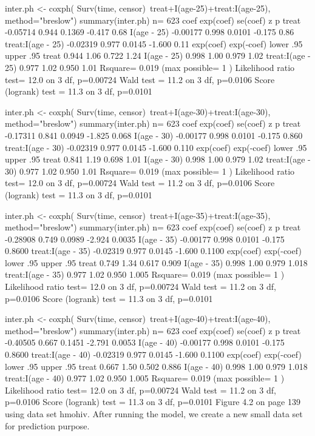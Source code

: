 inter.ph <- coxph( Surv(time, censor)~treat+I(age-25)+treat:I(age-25), method="breslow")
summary(inter.ph)
  n= 623 
                      coef exp(coef) se(coef)      z    p
treat             -0.05714     0.944   0.1369 -0.417 0.68
I(age - 25)       -0.00177     0.998   0.0101 -0.175 0.86
treat:I(age - 25) -0.02319     0.977   0.0145 -1.600 0.11
                  exp(coef) exp(-coef) lower .95 upper .95
treat                 0.944       1.06     0.722      1.24
I(age - 25)           0.998       1.00     0.979      1.02
treat:I(age - 25)     0.977       1.02     0.950      1.01
Rsquare= 0.019   (max possible= 1 )
Likelihood ratio test= 12.0  on 3 df,   p=0.00724
Wald test            = 11.2  on 3 df,   p=0.0106
Score (logrank) test = 11.3  on 3 df,   p=0.0101

inter.ph <- coxph( Surv(time, censor)~treat+I(age-30)+treat:I(age-30), method="breslow")
summary(inter.ph)
  n= 623 
                      coef exp(coef) se(coef)      z     p
treat             -0.17311     0.841   0.0949 -1.825 0.068
I(age - 30)       -0.00177     0.998   0.0101 -0.175 0.860
treat:I(age - 30) -0.02319     0.977   0.0145 -1.600 0.110
                  exp(coef) exp(-coef) lower .95 upper .95
treat                 0.841       1.19     0.698      1.01
I(age - 30)           0.998       1.00     0.979      1.02
treat:I(age - 30)     0.977       1.02     0.950      1.01
Rsquare= 0.019   (max possible= 1 )
Likelihood ratio test= 12.0  on 3 df,   p=0.00724
Wald test            = 11.2  on 3 df,   p=0.0106
Score (logrank) test = 11.3  on 3 df,   p=0.0101

inter.ph <- coxph( Surv(time, censor)~treat+I(age-35)+treat:I(age-35), method="breslow")
summary(inter.ph)
  n= 623 
                      coef exp(coef) se(coef)      z      p
treat             -0.28908     0.749   0.0989 -2.924 0.0035
I(age - 35)       -0.00177     0.998   0.0101 -0.175 0.8600
treat:I(age - 35) -0.02319     0.977   0.0145 -1.600 0.1100
                  exp(coef) exp(-coef) lower .95 upper .95
treat                 0.749       1.34     0.617     0.909
I(age - 35)           0.998       1.00     0.979     1.018
treat:I(age - 35)     0.977       1.02     0.950     1.005
Rsquare= 0.019   (max possible= 1 )
Likelihood ratio test= 12.0  on 3 df,   p=0.00724
Wald test            = 11.2  on 3 df,   p=0.0106
Score (logrank) test = 11.3  on 3 df,   p=0.0101

inter.ph <- coxph( Surv(time, censor)~treat+I(age-40)+treat:I(age-40), method="breslow")
summary(inter.ph)
  n= 623 
                      coef exp(coef) se(coef)      z      p
treat             -0.40505     0.667   0.1451 -2.791 0.0053
I(age - 40)       -0.00177     0.998   0.0101 -0.175 0.8600
treat:I(age - 40) -0.02319     0.977   0.0145 -1.600 0.1100
                  exp(coef) exp(-coef) lower .95 upper .95
treat                 0.667       1.50     0.502     0.886
I(age - 40)           0.998       1.00     0.979     1.018
treat:I(age - 40)     0.977       1.02     0.950     1.005
Rsquare= 0.019   (max possible= 1 )
Likelihood ratio test= 12.0  on 3 df,   p=0.00724
Wald test            = 11.2  on 3 df,   p=0.0106
Score (logrank) test = 11.3  on 3 df,   p=0.0101
Figure 4.2 on page 139 using data set hmohiv. After running the model, we create a new small data set for prediction purpose.

